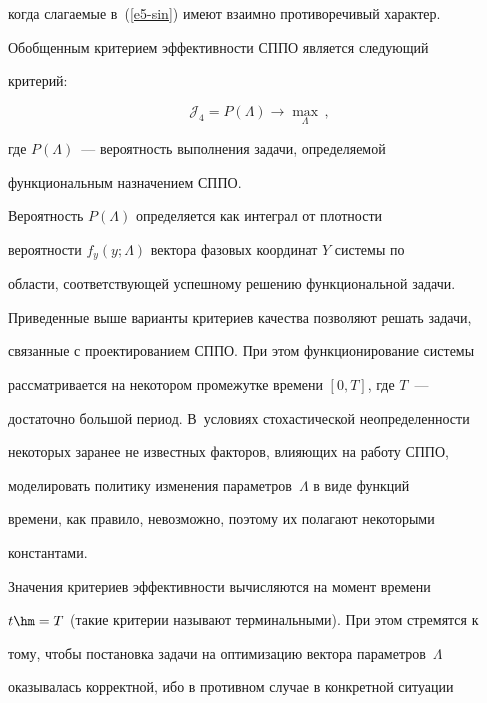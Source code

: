 когда слагаемые в~(\ref{e5-sin}) имеют взаимно противоречивый характер.



     Обобщенным критерием эффективности СППО является следующий

критерий:



\noindent

     \begin{equation*}

     \mathcal{J}_4= P(\Lambda) \to \max\limits_\Lambda\,,


     \end{equation*}

где $P(\Lambda)$~--- вероятность выполнения задачи, определяемой

функциональным назначением СППО.



     Вероятность $P(\Lambda)$ определяется как интеграл от плотности

вероятности $f_y(y;\Lambda)$ вектора фазовых координат $Y$ сис\-те\-мы по

области, соответствующей успешному решению функциональной задачи.



     Приведенные выше варианты критериев качества позволяют решать задачи,

связанные с проектированием СППО. При этом функционирование системы

рассматривается на некотором промежутке времени $[0, T]$, где $T$~---

достаточно большой период. В~условиях стохастической неопределенности

некоторых заранее не известных факторов, влияющих на работу СППО,

моделировать политику изменения параметров~$\Lambda$ в виде функций

времени, как правило, невозможно, поэтому их полагают некоторыми

константами.



     Значения критериев эффективности вычисляются на момент времени

$t\hm= T$ (такие критерии называют терминальными). При этом стремятся к

тому, чтобы постановка задачи на оптимизацию вектора параметров~$\Lambda$

оказывалась корректной, ибо в противном случае в конкретной ситуации

